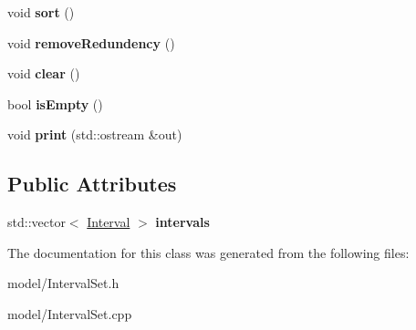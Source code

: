 \begin{DoxyCompactItemize}
\item 
\hypertarget{classIntervalSet_a20270c64f71dc09269616f2c786b2099}{void {\bfseries sort} ()}\label{classIntervalSet_a20270c64f71dc09269616f2c786b2099}

\item 
\hypertarget{classIntervalSet_a14472d035db8d0feb2d1991e1e2f224d}{void {\bfseries remove\-Redundency} ()}\label{classIntervalSet_a14472d035db8d0feb2d1991e1e2f224d}

\item 
\hypertarget{classIntervalSet_a09d89c38e3bde61406db9b8165f8ce58}{void {\bfseries clear} ()}\label{classIntervalSet_a09d89c38e3bde61406db9b8165f8ce58}

\item 
\hypertarget{classIntervalSet_a4838899be6c59eb67b2312252bda712a}{bool {\bfseries is\-Empty} ()}\label{classIntervalSet_a4838899be6c59eb67b2312252bda712a}

\item 
\hypertarget{classIntervalSet_a9af0e410e6c0cd2429b52a0fb03074b6}{void {\bfseries print} (std\-::ostream \&out)}\label{classIntervalSet_a9af0e410e6c0cd2429b52a0fb03074b6}

\end{DoxyCompactItemize}
\subsection*{Public Attributes}
\begin{DoxyCompactItemize}
\item 
\hypertarget{classIntervalSet_ae2d5f918006c88865525549db6db3880}{std\-::vector$<$ \hyperlink{classInterval}{Interval} $>$ {\bfseries intervals}}\label{classIntervalSet_ae2d5f918006c88865525549db6db3880}

\end{DoxyCompactItemize}


The documentation for this class was generated from the following files\-:\begin{DoxyCompactItemize}
\item 
model/Interval\-Set.\-h\item 
model/Interval\-Set.\-cpp\end{DoxyCompactItemize}
